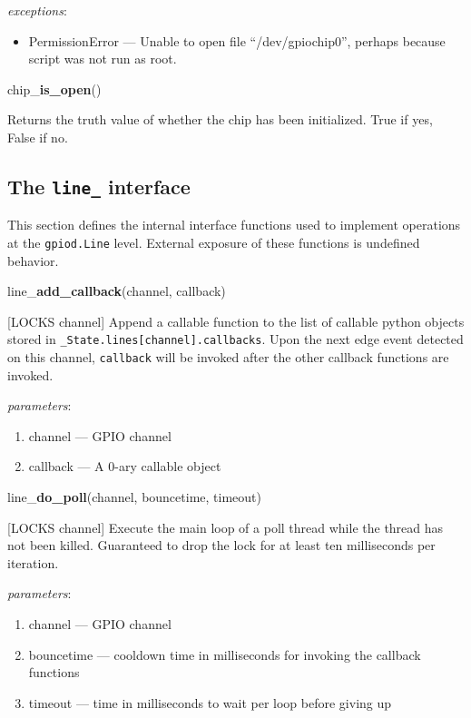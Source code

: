 \documentclass[12pt]{article}
\begin{document}
\textit{exceptions}:
\begin{itemize}
    \item PermissionError --- Unable to open file ``/dev/gpiochip0'', perhaps because script was not run as root.
\end{itemize}

\noindent chip\_\textbf{is\_open}()

Returns the truth value of whether the chip has been initialized.
True if yes, False if no.

\subsection{The \texttt{line\_} interface}

This section defines the internal interface functions used to implement operations at the \texttt{gpiod.Line} level. External exposure of these functions is undefined behavior.

\medskip

\noindent line\_\textbf{add\_callback}(channel, callback)

[LOCKS channel] Append a callable function to the list of callable python objects stored in \texttt{\_State.lines[channel].callbacks}. Upon the next edge event detected on this channel, \texttt{callback} will be invoked after the other callback functions are invoked. 

\textit{parameters}:
\begin{enumerate}      
        \item channel --- GPIO channel
        \item callback --- A 0-ary callable object
\end{enumerate}

\noindent line\_\textbf{do\_poll}(channel, bouncetime, timeout)

[LOCKS channel] Execute the main loop of a poll thread while the thread has not been killed. Guaranteed to drop the lock for at least ten milliseconds per iteration.

\textit{parameters}:
\begin{enumerate}      
        \item channel --- GPIO channel
        \item bouncetime --- cooldown time in milliseconds for invoking the callback functions
        \item timeout --- time in milliseconds to wait per loop before giving up
\end{enumerate}
\end{document}
